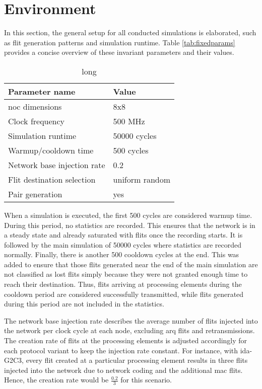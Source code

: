 
\section{Environment}\label{sec:environmenteval}
In this section, the general setup for all conducted simulations is elaborated, such as flit generation patterns and simulation runtime. Table
\vref{tab:fixedparams} provides a concise overview of these invariant parameters and their values.

\begin{table}
    \centering
    \begin{tabulary}{\textwidth}{L|L}
        Parameter name & Value \\\hline
        \Gls{noc} dimensions & 8x8 \\
        Clock frequency & 500 MHz \\
        Simulation runtime & \num{50000} cycles \\
        Warmup/cooldown time & 500 cycles \\
        Network base injection rate & 0.2 \\
        Flit destination selection & uniform random \\
        Pair generation & yes \\
    \end{tabulary}
    \caption[short]{long}
    \label{tab:fixedparams}
\end{table}

When a simulation is executed, the first 500 cycles are considered warmup time. During this period, no statistics are recorded. This ensures that the
network is in a steady state and already saturated with flits once the recording starts. It is followed by the main simulation of \num{50000}
cycles where statistics are recorded normally. Finally, there is another 500 cooldown cycles at the end. This was added to ensure that those flits
generated near the end of the main simulation are not classified as lost flits simply because they were not granted enough time to reach their
destination. Thus, flits arriving at processing elements during the cooldown period are considered successfully transmitted, while flits generated
during this period are not included in the statistics.

The network base injection rate describes the average number of flits injected into the network per clock cycle at each node, excluding \gls{arq}
flits and retransmissions. The creation rate of flits at the processing elements is adjusted accordingly for each protocol variant to keep the
injection rate constant. For instance, with \gls{ida}-G2C3, every flit created at a particular processing element results in three flits injected
into the network due to network coding and the additional \gls{mac} flits. Hence, the creation rate would be $\frac{0.2}{3}$ for this scenario.


